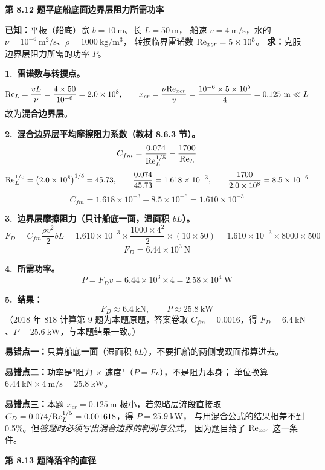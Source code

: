 \noindent\textbf{第 8.12 题\quad 平底船底面边界层阻力所需功率}

\begin{jie}
\textbf{已知：}平板（船底）宽 $b=10\ \mathrm{m}$、长 $L=50\ \mathrm{m}$，
船速 $v=4\ \mathrm{m/s}$，水的 $\nu=10^{-6}\ \mathrm{m^2/s}$、$\rho=1000\ \mathrm{kg/m^3}$，
转捩临界雷诺数 $\mathrm{Re}_{xcr}=5\times10^5$。
\textbf{求：}克服边界层阻力所需的功率 $P$。

\textbf{1.\ 雷诺数与转捩点。}
\[
\Rey_L=\frac{vL}{\nu}=\frac{4\times50}{10^{-6}}=2.0\times10^8,
\qquad
x_{cr}=\frac{\nu\Rey_{xcr}}{v}=\frac{10^{-6}\times5\times10^5}{4}=0.125\ \mathrm{m}\ll L
\]
故为\textbf{混合边界层}。

\textbf{2.\ 混合边界层平均摩擦阻力系数（教材 8.6.3 节）。}
\[
C_{fm}=\frac{0.074}{\mathrm{Re}_L^{1/5}}-\frac{1700}{\mathrm{Re}_L}
\]
\[
\mathrm{Re}_L^{1/5}=\left(2.0\times10^8\right)^{1/5}=45.73,\qquad
\frac{0.074}{45.73}=1.618\times10^{-3},\qquad
\frac{1700}{2.0\times10^8}=8.5\times10^{-6}
\]
\[
C_{fm}=1.618\times10^{-3}-8.5\times10^{-6}=1.610\times10^{-3}
\]

\textbf{3.\ 边界层摩擦阻力（只计船底一面，湿面积 $bL$）。}
\[
F_D=C_{fm}\frac{\rho v^2}{2}bL
=1.610\times10^{-3}\times\frac{1000\times4^2}{2}\times(10\times50)
=1.610\times10^{-3}\times8000\times500
\]
\[
F_D=6.44\times10^3\ \mathrm{N}
\]

\textbf{4.\ 所需功率。}
\[
P=F_Dv=6.44\times10^3\times4=2.58\times10^4\ \mathrm{W}
\]

\textbf{5.\ 结果：}
\[
\boxed{\,F_D\approx6.4\ \mathrm{kN},\qquad P\approx25.8\ \mathrm{kW}\,}
\]
（2018 年 818 计算第 9 题为本题原题，答案卷取 $C_{fm}=0.0016$，得
$F_D=6.4\ \mathrm{kN}$、$P=25.6\ \mathrm{kW}$，与本题结果一致。）
\end{jie}

\begin{yicuo}
\textbf{易错点一：}只算船底\textbf{一面}（湿面积 $bL$），不要把船的两侧或双面都算进去。

\textbf{易错点二：}功率是"阻力 $\times$ 速度"（$P=Fv$），不是阻力本身；
单位换算 $6.44\ \mathrm{kN}\times4\ \mathrm{m/s}=25.8\ \mathrm{kW}$。

\textbf{易错点三：}本题 $x_{cr}=0.125\ \mathrm{m}$ 极小，若忽略层流段直接取
$C_D=0.074/\mathrm{Re}_L^{1/5}=0.001618$，得 $P=25.9\ \mathrm{kW}$，
与用混合公式的结果相差不到 0.5\%。但\emph{答题时必须写出混合边界的判别与公式}，
因为题目给了 $\mathrm{Re}_{xcr}$ 这一条件。
\end{yicuo}

\noindent\textbf{第 8.13 题\quad 降落伞的直径}

